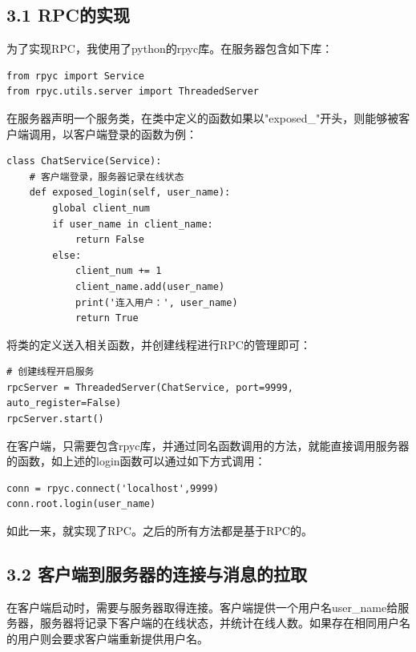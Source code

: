 \documentclass{report}
\begin{document}
\subsection*{3.1 RPC的实现}
为了实现RPC，我使用了python的rpyc库。在服务器包含如下库：
\begin{lstlisting}
from rpyc import Service
from rpyc.utils.server import ThreadedServer
\end{lstlisting}
在服务器声明一个服务类，在类中定义的函数如果以"exposed\_"开头，则能够被客户端调用，以客户端登录的函数为例：
\begin{lstlisting}
class ChatService(Service):
    # 客户端登录，服务器记录在线状态        
    def exposed_login(self, user_name):
        global client_num
        if user_name in client_name:
            return False
        else:
            client_num += 1
            client_name.add(user_name)
            print('连入用户：', user_name)
            return True
\end{lstlisting}
将类的定义送入相关函数，并创建线程进行RPC的管理即可：
\begin{lstlisting}
# 创建线程开启服务
rpcServer = ThreadedServer(ChatService, port=9999, auto_register=False)  
rpcServer.start()
\end{lstlisting}
在客户端，只需要包含rpyc库，并通过同名函数调用的方法，就能直接调用服务器的函数，如上述的login函数可以通过如下方式调用：
\begin{lstlisting}
conn = rpyc.connect('localhost',9999)
conn.root.login(user_name)
\end{lstlisting}
如此一来，就实现了RPC。之后的所有方法都是基于RPC的。

\subsection*{3.2 客户端到服务器的连接与消息的拉取}
在客户端启动时，需要与服务器取得连接。客户端提供一个用户名user\_name给服务器，服务器将记录下客户端的在线状态，并统计在线人数。如果存在相同用户名的用户则会要求客户端重新提供用户名。
\end{document}
